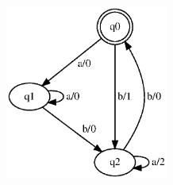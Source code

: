 \documentclass[10pt]{beamer}
\begin{document}
\begin{frame}
\begin{columns}[T]
\begin{column}{.70\textwidth}
\centering
\includegraphics[width=0.4\textwidth]{images/fsm-example01_orig}

\end{column}
\end{columns}
\end{frame}
\end{document}

